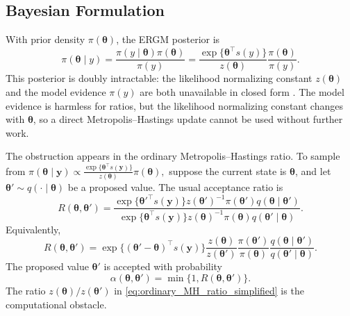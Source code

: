 \documentclass[preprint,12pt,authoryear]{elsarticle}
\def\bs{\boldsymbol}
\def\th{\boldsymbol{\theta}}
\begin{document}
\subsection{Bayesian Formulation}
With prior density \(\pi(\th)\), the ERGM posterior is
\begin{equation}\label{posterior}
    \pi(\th \mid y)
    =
    \frac{\pi(y\mid\th)\pi(\th)}{\pi(y)}
    =
    \frac{\exp\{\th^\top s(y)\}}{z(\th)}
    \frac{\pi(\th)}{\pi(y)}.
\end{equation}
This posterior is doubly intractable: the likelihood normalizing constant \(z(\th)\) and the model evidence \(\pi(y)\) are both unavailable in closed form \citep{lusher2013}. The model evidence is harmless for ratios, but the likelihood normalizing constant changes with \(\th\), so a direct Metropolis--Hastings update cannot be used without further work.


The obstruction appears in the ordinary Metropolis--Hastings ratio. To sample from
$
\pi(\th\mid \bs y)
\propto
\displaystyle\frac{\exp\{\th^\top s(\bs y)\}}{z(\th)}\pi(\th),
$
suppose the current state is \(\th\), and let
\(\th'\sim q(\cdot\mid \th)\) be a proposed value. The usual acceptance ratio is
\begin{equation}\label{eq:ordinary_MH_ratio}
R(\th,\th')
=
\frac{
\exp\{\th'^\top s(\bs y)\}z(\th')^{-1}\pi(\th')q(\th\mid \th')
}{
\exp\{\th^\top s(\bs y)\}z(\th)^{-1}\pi(\th)q(\th'\mid \th)
}.
\end{equation}
Equivalently,
\begin{equation}\label{eq:ordinary_MH_ratio_simplified}
R(\th,\th')
=
\exp\{(\th'-\th)^\top s(\bs y)\}
\frac{z(\th)}{z(\th')}
\frac{\pi(\th')}{\pi(\th)}
\frac{q(\th\mid \th')}{q(\th'\mid \th)}.
\end{equation}
The proposed value \(\th'\) is accepted with probability
\[
\alpha(\th,\th')=\min\{1,R(\th,\th')\}.
\]
The ratio \(z(\th)/z(\th')\) in
\eqref{eq:ordinary_MH_ratio_simplified} is the computational obstacle.
\end{document}
